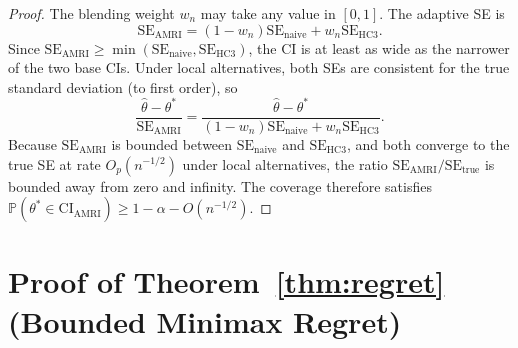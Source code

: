 \documentclass[12pt]{article}
\theoremstyle{definition}
\theoremstyle{remark}
\newcommand{\Prob}{\mathbb{P}}
\newcommand{\se}{\mathrm{SE}}
\newcommand{\CI}{\mathrm{CI}}
\begin{document}
\begin{proof}
The blending weight $w_n$ may take any value in $[0, 1]$. The adaptive SE is
\[
\se_{\mathrm{AMRI}} = (1 - w_n) \se_{\mathrm{naive}} + w_n \se_{\mathrm{HC3}}.
\]
Since $\se_{\mathrm{AMRI}} \geq \min(\se_{\mathrm{naive}}, \se_{\mathrm{HC3}})$, the CI is at least as wide as the narrower of the two base CIs. Under local alternatives, both SEs are consistent for the true standard deviation (to first order), so
\[
\frac{\hat\theta - \theta^*}{\se_{\mathrm{AMRI}}} = \frac{\hat\theta - \theta^*}{(1-w_n)\se_{\mathrm{naive}} + w_n \se_{\mathrm{HC3}}}.
\]
Because $\se_{\mathrm{AMRI}}$ is bounded between $\se_{\mathrm{naive}}$ and $\se_{\mathrm{HC3}}$, and both converge to the true SE at rate $O_p(n^{-1/2})$ under local alternatives, the ratio $\se_{\mathrm{AMRI}}/\se_{\mathrm{true}}$ is bounded away from zero and infinity. The coverage therefore satisfies $\Prob(\theta^* \in \CI_{\mathrm{AMRI}}) \geq 1 - \alpha - O(n^{-1/2})$.
\end{proof}


\section{Proof of Theorem~\ref{thm:regret} (Bounded Minimax Regret)}\label{app:thm3}
\end{document}
